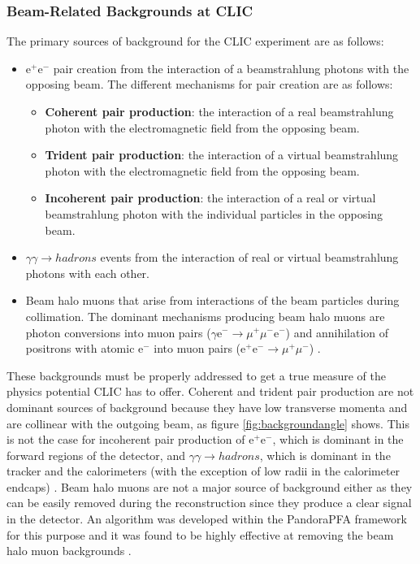 \subsubsection{Beam-Related Backgrounds at CLIC}
\label{sec:beamrelatedbackgrounds}
The primary sources of background for the CLIC experiment are as follows:
\begin{itemize}
\item $\text{e}^{+}\text{e}^{-}$ pair creation from the interaction of a beamstrahlung photons with the opposing beam.  The different mechanisms for pair creation are as follows:
\begin{itemize}
\item \textbf{Coherent pair production}: the interaction of a real beamstrahlung photon with the electromagnetic field from the opposing beam.
\item \textbf{Trident pair production}: the interaction of a virtual beamstrahlung photon with the electromagnetic field from the opposing beam.
\item \textbf{Incoherent pair production}: the interaction of a real or virtual beamstrahlung photon with the individual particles in the opposing beam.
\end{itemize}
\item $\gamma\gamma \rightarrow hadrons$ events from the interaction of real or virtual beamstrahlung photons with each other.  
\item Beam halo muons that arise from interactions of the beam particles during collimation.  The dominant mechanisms producing beam halo muons are photon conversions into muon pairs ($\gamma \text{e}^{-} \rightarrow \mu^{+}\mu^{-}\text{e}^{-}$) and annihilation of positrons with atomic $\text{e}^{-}$ into muon pairs ($\text{e}^{+}\text{e}^{-} \rightarrow \mu^{+}\mu^{-}$) \cite{Pilicer:2015ijy}.
\end{itemize}

These backgrounds must be properly addressed to get a true measure of the physics potential CLIC has to offer.  Coherent and trident pair production are not dominant sources of background because they have low transverse momenta and are collinear with the outgoing beam, as figure \ref{fig:backgroundangle} shows.  This is not the case for incoherent pair production of $\text{e}^{+}\text{e}^{-}$, which is dominant in the forward regions of the detector, and $\gamma\gamma \rightarrow hadrons$, which is dominant in the tracker and the calorimeters (with the exception of low radii in the calorimeter endcaps) \cite{Linssen:2012hp, Sailer:2012mfa}.  Beam halo muons are not a major source of background either as they can be easily removed during the reconstruction since they produce a clear signal in the detector.  An algorithm was developed within the PandoraPFA framework for this purpose and it was found to be highly effective at removing the beam halo muon backgrounds \cite{Linssen:2012hp}.  

